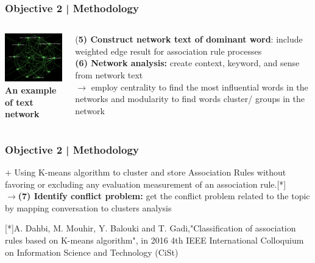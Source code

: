 \documentclass{beamer}
\begin{document}
\begin{frame}
\frametitle{Objective 2 | Methodology}
\begin{columns}
	\begin{column}{.35\textwidth}
		\includegraphics[width=40mm]{nw.png}\\
{\scriptsize 	\textbf{An example of text network}}
	\end{column}

	\begin{column}{.60\textwidth}
(\textbf{5) Construct network text of dominant word}: include weighted edge result for association rule processes\\
\textbf{(6) Network analysis:} create context, keyword, and sense from network text\\
$\rightarrow$ employ centrality to find the most influential words in the networks and modularity to find words cluster/ groups in the network \\

	\end{column}
\end{columns}
\end{frame}
\begin{frame}
\frametitle{Objective 2 | Methodology}
+ Using K-means algorithm to cluster and  store Association Rules without favoring or excluding any evaluation measurement of an association rule.[*] \\


$\rightarrow$\textbf{(7) Identify conflict problem:} get the conflict problem related to the topic by mapping conversation to clusters analysis\\
\begin{center}
	
\end{center}
{\tiny 
 [*]A. {Dahbi}, M. {Mouhir}, Y. {Balouki} and T. {Gadi},"Classification of association rules based on K-means algorithm", in 2016 4th IEEE International Colloquium on Information Science and Technology (CiSt)}
\end{frame}
\end{document}

